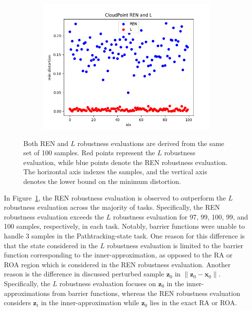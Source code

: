 \documentclass[conference]{IEEEtran}
\newcommand{\ren}{\textsc{REN}\xspace}
\newcommand{\roa}{\textsc{ROA}\xspace}
\newcommand{\ra}{\textsc{RA}\xspace}
\newcommand{\myvec}[1]{\boldsymbol{#1}}
\begin{document}
\begin{figure}[htbp]
\begin{subfigure}[b]{0.15\textwidth}
    \includegraphics[width=\textwidth]{figures/experiment 2/Q2dout}
    \caption{}
  \end{subfigure}
  \hspace*{\fill}
  \caption{
  Both \ren and $L$ robustness evaluations 
  are derived from the same set of 100 samples. 
  Red points represent the $L$ robustness 
  evaluation, while blue points denote 
  the \ren robustness evaluation. The horizontal 
  axis indexes the samples, and the vertical 
  axis denotes the lower bound on the 
  minimum distortion.
}\label{fig:experiment2}
  
\end{figure}

In Figure~\ref{fig:experiment2}, the \ren robustness 
evaluation is observed to outperform the $L$ 
robustness evaluation across the majority of 
tasks. Specifically, the \ren robustness evaluation 
exceeds the $L$ robustness evaluation for 
97, 99, 100, 99, and 100 samples, respectively, 
in each task.
Notably, barrier functions were unable 
to handle 3 samples in the Pathtracking-state task. 
One reason for this difference is that the 
state considered in the $L$ robustness evaluation 
is limited to the barrier function corresponding 
to the inner-approximation, 
as opposed to the \ra or \roa region 
which is considered in the \ren robustness 
evaluation. Another reason is the difference 
in discussed perturbed sample $\myvec{z}_{0}$ 
in $\lVert \myvec{z}_{0} - \myvec{x}_{0} \rVert$. 
Specifically, the $L$ robustness evaluation 
focuses on $\myvec{z}_{0}$ 
in the inner-approximations 
from barrier functions, 
whereas the \ren robustness evaluation 
considers $\myvec{z}_{t}$ in the inner-approximation
while $\myvec{z}_{0}$ lies in the exact \ra 
or \roa. 
\end{document}
